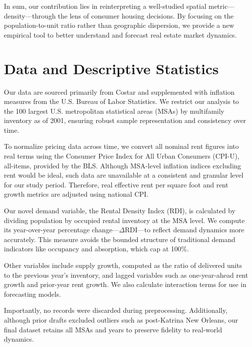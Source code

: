 \documentclass[sn-mathphys-num]{sn-jnl}%
\begin{document}
In sum, our contribution lies in reinterpreting a well-studied spatial metric---density---through the lens of consumer housing decisions. By focusing on the population-to-unit ratio rather than geographic dispersion, we provide a new empirical tool to better understand and forecast real estate market dynamics.

\section*{Data and Descriptive Statistics}

Our data are sourced primarily from Costar and supplemented with inflation measures from the U.S. Bureau of Labor Statistics. We restrict our analysis to the 100 largest U.S. metropolitan statistical areas (MSAs) by multifamily inventory as of 2001, ensuring robust sample representation and consistency over time.

To normalize pricing data across time, we convert all nominal rent figures into real terms using the Consumer Price Index for All Urban Consumers (CPI-U), all-items, provided by the BLS. Although MSA-level inflation indices excluding rent would be ideal, such data are unavailable at a consistent and granular level for our study period. Therefore, real effective rent per square foot and rent growth metrics are adjusted using national CPI.

Our novel demand variable, the Rental Density Index (RDI), is calculated by dividing population by occupied rental inventory at the MSA level. We compute its year-over-year percentage change---\(\Delta\text{RDI}\)---to reflect demand dynamics more accurately. This measure avoids the bounded structure of traditional demand indicators like occupancy and absorption, which cap at 100\%.

Other variables include supply growth, computed as the ratio of delivered units to the previous year's inventory, and lagged variables such as one-year-ahead rent growth and prior-year rent growth. We also calculate interaction terms for use in forecasting models.

Importantly, no records were discarded during preprocessing. Additionally, although prior drafts excluded outliers such as post-Katrina New Orleans, our final dataset retains all MSAs and years to preserve fidelity to real-world dynamics.
\end{document}

